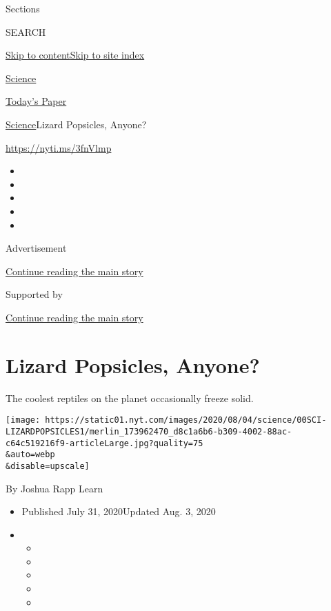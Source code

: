 Sections

SEARCH

\protect\hyperlink{site-content}{Skip to
content}\protect\hyperlink{site-index}{Skip to site index}

\href{https://www.nytimes.com/section/science}{Science}

\href{https://myaccount.nytimes.com/auth/login?response_type=cookie\&client_id=vi}{}

\href{https://www.nytimes.com/section/todayspaper}{Today's Paper}

\href{/section/science}{Science}\textbar{}Lizard Popsicles, Anyone?

\url{https://nyti.ms/3fnVlmp}

\begin{itemize}
\item
\item
\item
\item
\item
\end{itemize}

Advertisement

\protect\hyperlink{after-top}{Continue reading the main story}

Supported by

\protect\hyperlink{after-sponsor}{Continue reading the main story}

\hypertarget{lizard-popsicles-anyone}{%
\section{Lizard Popsicles, Anyone?}\label{lizard-popsicles-anyone}}

The coolest reptiles on the planet occasionally freeze solid.

\texttt{[image: https://static01.nyt.com/images/2020/08/04/science/00SCI-LIZARDPOPSICLES1/merlin\_173962470\_d8c1a6b6-b309-4002-88ac-c64c519216f9-articleLarge.jpg?quality=75\\\&auto=webp\\\&disable=upscale]}

By Joshua Rapp Learn

\begin{itemize}
\item
  Published July 31, 2020Updated Aug. 3, 2020
\item
  \begin{itemize}
  \item
  \item
  \item
  \item
  \item
  \end{itemize}
\end{itemize}

